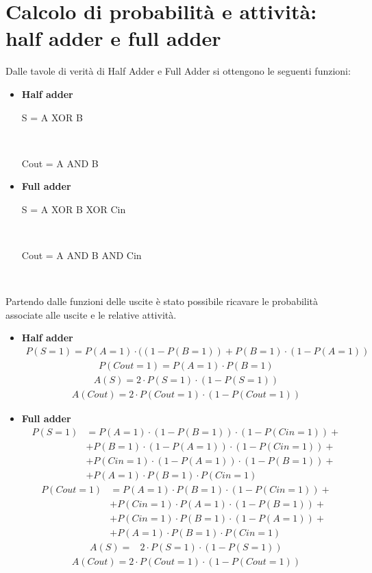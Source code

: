 \documentclass[11pt,  english, makeidx, a4paper, titlepage, oneside]{book}
\begin{document}
\section{Calcolo di probabilità e attività: half adder e full adder} %
Dalle tavole di verità di Half Adder e Full Adder si ottengono le seguenti funzioni:
\begin{itemize}
	\item \textbf{Half adder} \\
	\centerline{S = A XOR B} \\
	\centerline{Cout = A AND B}
	\item \textbf{Full adder} \\
	\centerline{S = A XOR B XOR Cin} \\
	\centerline{Cout = A AND B AND Cin} \\
\end{itemize}
Partendo dalle funzioni delle uscite è stato possibile ricavare le probabilità
associate alle uscite e le relative attività.
\begin{itemize}
	\item \textbf{Half adder}\\
	\begin{align*}
	P(S=1) = P(A=1) \cdot ((1-P(B=1)) + P(B=1) \cdot (1-P(A=1))
	\end{align*}
	\begin{align*}
	P(Cout=1) = P(A=1) \cdot P(B=1)
	\end{align*}
	\begin{align*}
	A(S) = 2 \cdot P(S=1) \cdot (1-P(S=1))
	\end{align*}
    \begin{align*}
    A(Cout) = 2 \cdot P(Cout=1) \cdot (1-P(Cout=1)) 
    \end{align*}	
	\item \textbf{Full adder}
	\begin{align*}
	P(S=1) & = P(A=1) \cdot(1-P(B=1)) \cdot (1-P(Cin=1)) + \\ 
	          & + P(B=1) \cdot(1-P(A=1)) \cdot (1-P(Cin=1)) + \\
	          & + P(Cin=1) \cdot (1-P(A=1)) \cdot(1-P(B=1)) + \\
	          & + P(A=1) \cdot P(B=1) \cdot P(Cin=1)
	  \end{align*}   
	 \begin{align*}
	 	P(Cout=1) & = P(A=1) \cdot P(B=1) \cdot (1-P(Cin=1)) +\\
	 					& + P(Cin=1) \cdot P(A=1) \cdot (1-P(B=1)) +\\
	 					& + P(Cin=1) \cdot P(B=1) \cdot (1-P(A=1)) +\\
	 					& + P(A=1) \cdot P(B=1) \cdot P(Cin=1)
	 \end{align*}
	 \begin{align*}
	 A(S) = & 2 \cdot P(S=1) \cdot (1-P(S=1))
	 \end{align*}
	\begin{align*}
	A(Cout) =2 \cdot P(Cout=1) \cdot (1-P(Cout=1))
	\end{align*}	
\end{itemize} 
\end{document}
